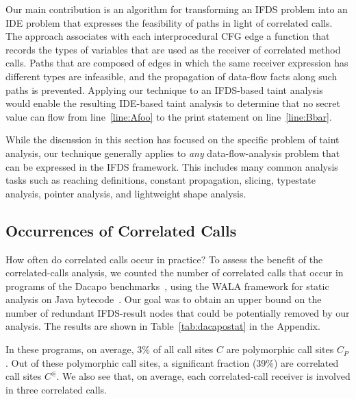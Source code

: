 Our main contribution is an algorithm for transforming an IFDS problem 
into an IDE problem that expresses the feasibility of paths
in light of correlated calls.
The approach associates with each interprocedural CFG edge 
a function that records the types of 
variables that are used as the receiver of correlated method calls. Paths that 
are composed of edges in which the same receiver expression has different types
are infeasible, and the propagation of data-flow facts along such paths is
prevented. Applying our technique to an IFDS-based taint analysis would enable
the resulting IDE-based taint analysis to determine that no secret value can flow from
line~\ref{line:Afoo} to the print statement on line~\ref{line:Bbar}. 

While the discussion in this section has focused on the specific problem of taint analysis,
our technique generally applies to \textit{any}
data-flow-analysis problem that can be expressed in the IFDS framework. This includes
many common analysis tasks such as reaching definitions, constant propagation, slicing,
typestate analysis, pointer analysis, and lightweight
shape analysis.

\subsection{Occurrences of Correlated Calls}\vspace{-.5mm}
How often do correlated calls occur in practice? To assess the benefit of the correlated-calls analysis, we counted the number of correlated calls that occur in programs of the Dacapo benchmarks~\cite{blackburn2006dacapo}, using the WALA framework for static analysis on Java bytecode~\cite{fink2012wala}.
Our goal was to obtain an upper bound on the number of redundant IFDS-result nodes that could be potentially removed by our analysis. The results are shown in Table~\ref{tab:dacapostat} in the Appendix.

In these programs, on average, 3\% of all call sites $C$ are polymorphic call sites $C_P$.
Out of these polymorphic call sites, a significant fraction (39\%) are correlated 
call sites $C^\Subset$. We also see that, on average,  each correlated-call receiver is involved in three correlated calls. 

